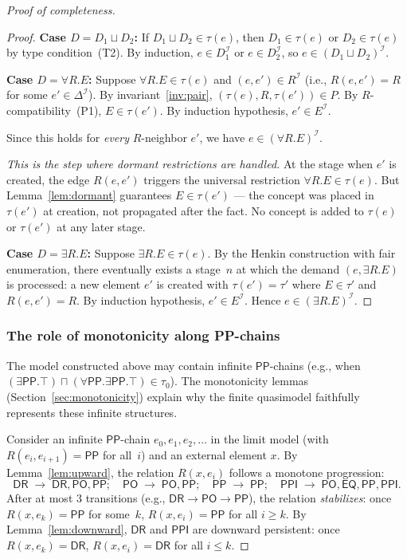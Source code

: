 \documentclass[a4paper,11pt]{article}
\theoremstyle{definition}
\newcommand{\DeltaI}{\ensuremath{\Delta^{\mathcal{I}}}}
\newcommand{\interp}{\ensuremath{\mathcal{I}}}
\newcommand{\DR}{\ensuremath{\mathsf{DR}}}
\newcommand{\PO}{\ensuremath{\mathsf{PO}}}
\newcommand{\EQ}{\ensuremath{\mathsf{EQ}}}
\newcommand{\PP}{\ensuremath{\mathsf{PP}}}
\newcommand{\PPI}{\ensuremath{\mathsf{PPI}}}
\begin{document}
\begin{proof}[Proof of completeness]
\begin{proof}
\smallskip\noindent\textbf{Case $D = D_1 \sqcup D_2$:}\;
If $D_1 \sqcup D_2 \in \tau(e)$, then $D_1 \in \tau(e)$ or $D_2 \in
\tau(e)$ by type condition~(T2).  By induction, $e \in
D_1^{\interp}$ or $e \in D_2^{\interp}$, so $e \in (D_1 \sqcup
D_2)^{\interp}$.

\smallskip\noindent\textbf{Case $D = \forall R.E$:}\;
Suppose $\forall R.E \in \tau(e)$ and $(e, e') \in R^{\interp}$
(i.e., $R(e, e') = R$ for some $e' \in \DeltaI$).  By
invariant~\ref{inv:pair}, $(\tau(e), R, \tau(e')) \in P$.  By
$R$-compatibility~(P1), $E \in \tau(e')$.  By induction hypothesis,
$e' \in E^{\interp}$.

Since this holds for \emph{every} $R$-neighbor $e'$, we have $e \in
(\forall R.E)^{\interp}$.

\emph{This is the step where dormant restrictions are handled.}  At
the stage when $e'$ is created, the edge $R(e, e')$ triggers the
universal restriction $\forall R.E \in \tau(e)$.  But
Lemma~\ref{lem:dormant} guarantees $E \in \tau(e')$ --- the concept
was placed in $\tau(e')$ at creation, not propagated after the fact.
No concept is added to $\tau(e)$ or $\tau(e')$ at any later stage.

\smallskip\noindent\textbf{Case $D = \exists R.E$:}\;
Suppose $\exists R.E \in \tau(e)$.  By the Henkin construction with
fair enumeration, there eventually exists a stage~$n$ at which the
demand $(e, \exists R.E)$ is processed: a new element $e'$ is created
with $\tau(e') = \tau'$ where $E \in \tau'$ and $R(e, e') = R$.  By
induction hypothesis, $e' \in E^{\interp}$.  Hence $e \in (\exists
R.E)^{\interp}$.
\end{proof}

\subsubsection*{The role of monotonicity along PP-chains}

The model constructed above may contain infinite $\PP$-chains (e.g.,
when $(\exists \PP.\top) \sqcap (\forall \PP.\exists \PP.\top) \in
\tau_0$).  The monotonicity lemmas (Section~\ref{sec:monotonicity})
explain why the finite quasimodel faithfully represents these infinite
structures.

Consider an infinite $\PP$-chain $e_0, e_1, e_2, \ldots$ in the
limit model (with $R(e_i, e_{i+1}) = \PP$ for all~$i$) and an
external element $x$.  By Lemma~\ref{lem:upward}, the relation $R(x,
e_i)$ follows a monotone progression:
\[
  \DR \;\to\; \DR, \PO, \PP; \quad
  \PO \;\to\; \PO, \PP; \quad
  \PP \;\to\; \PP; \quad
  \PPI \;\to\; \PO, \EQ, \PP, \PPI.
\]
After at most 3 transitions (e.g., $\DR \to \PO \to \PP$), the
relation \emph{stabilizes}: once $R(x, e_k) = \PP$ for some~$k$,
$R(x, e_i) = \PP$ for all $i \geq k$.  By Lemma~\ref{lem:downward},
$\DR$ and $\PPI$ are downward persistent: once $R(x, e_k) = \DR$,
$R(x, e_i) = \DR$ for all $i \leq k$.


\end{proof}
\end{document}
